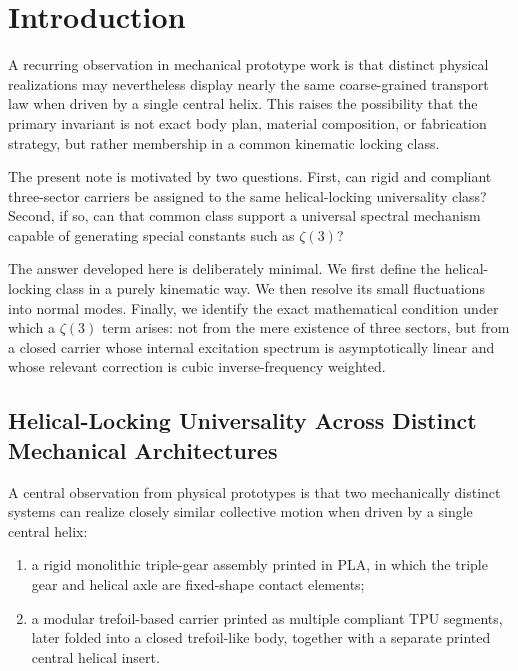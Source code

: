 \documentclass[11pt]{article}
\begin{document}
    \section{Introduction}
        
        A recurring observation in mechanical prototype work is that distinct physical realizations may nevertheless display nearly the same coarse-grained transport law when driven by a single central helix. This raises the possibility that the primary invariant is not exact body plan, material composition, or fabrication strategy, but rather membership in a common kinematic locking class.
        
        The present note is motivated by two questions. First, can rigid and compliant three-sector carriers be assigned to the same helical-locking universality class? Second, if so, can that common class support a universal spectral mechanism capable of generating special constants such as \(\zeta(3)\)?
        
        The answer developed here is deliberately minimal. We first define the helical-locking class in a purely kinematic way. We then resolve its small fluctuations into normal modes. Finally, we identify the exact mathematical condition under which a \(\zeta(3)\) term arises: not from the mere existence of three sectors, but from a closed carrier whose internal excitation spectrum is asymptotically linear and whose relevant correction is cubic inverse-frequency weighted.
        
        \subsection{Helical-Locking Universality Across Distinct Mechanical Architectures}
            \label{subsec:helical_locking_universality_architecture}
            
            A central observation from physical prototypes is that two mechanically distinct systems can realize closely similar collective motion when driven by a single central helix:
            
            \begin{enumerate}
                \item a rigid monolithic triple-gear assembly printed in PLA, in which the triple gear and helical axle are fixed-shape contact elements;
                \item a modular trefoil-based carrier printed as multiple compliant TPU segments, later folded into a closed trefoil-like body, together with a separate printed central helical insert.
            \end{enumerate}
            
\end{document}
